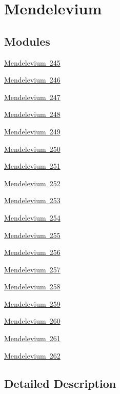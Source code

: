 \hypertarget{group___isotope_const-_mendelevium}{}\section{Mendelevium}
\label{group___isotope_const-_mendelevium}
\subsection*{Modules}
\begin{DoxyCompactItemize}
\item 
\mbox{\hyperlink{group___isotope_const-_mendelevium-_md245}{Mendelevium 245}}
\item 
\mbox{\hyperlink{group___isotope_const-_mendelevium-_md246}{Mendelevium 246}}
\item 
\mbox{\hyperlink{group___isotope_const-_mendelevium-_md247}{Mendelevium 247}}
\item 
\mbox{\hyperlink{group___isotope_const-_mendelevium-_md248}{Mendelevium 248}}
\item 
\mbox{\hyperlink{group___isotope_const-_mendelevium-_md249}{Mendelevium 249}}
\item 
\mbox{\hyperlink{group___isotope_const-_mendelevium-_md250}{Mendelevium 250}}
\item 
\mbox{\hyperlink{group___isotope_const-_mendelevium-_md251}{Mendelevium 251}}
\item 
\mbox{\hyperlink{group___isotope_const-_mendelevium-_md252}{Mendelevium 252}}
\item 
\mbox{\hyperlink{group___isotope_const-_mendelevium-_md253}{Mendelevium 253}}
\item 
\mbox{\hyperlink{group___isotope_const-_mendelevium-_md254}{Mendelevium 254}}
\item 
\mbox{\hyperlink{group___isotope_const-_mendelevium-_md255}{Mendelevium 255}}
\item 
\mbox{\hyperlink{group___isotope_const-_mendelevium-_md256}{Mendelevium 256}}
\item 
\mbox{\hyperlink{group___isotope_const-_mendelevium-_md257}{Mendelevium 257}}
\item 
\mbox{\hyperlink{group___isotope_const-_mendelevium-_md258}{Mendelevium 258}}
\item 
\mbox{\hyperlink{group___isotope_const-_mendelevium-_md259}{Mendelevium 259}}
\item 
\mbox{\hyperlink{group___isotope_const-_mendelevium-_md260}{Mendelevium 260}}
\item 
\mbox{\hyperlink{group___isotope_const-_mendelevium-_md261}{Mendelevium 261}}
\item 
\mbox{\hyperlink{group___isotope_const-_mendelevium-_md262}{Mendelevium 262}}
\end{DoxyCompactItemize}


\subsection{Detailed Description}
